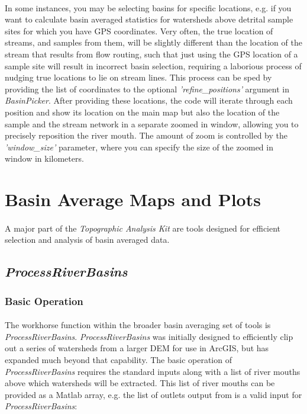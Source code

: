 \paragraph{}In some instances, you may be selecting basins for specific locations, e.g. if you want to calculate basin averaged statistics for watersheds above detrital sample sites for which you have GPS coordinates. Very often, the true location of streams, and samples from them, will be slightly different than the location of the stream that results from flow routing, such that just using the GPS location of a sample site will result in incorrect basin selection, requiring a laborious process of nudging true locations to lie on stream lines. This process can be sped by providing the list of coordinates to the optional \textit{'refine\_positions'} argument in \textit{BasinPicker}. After providing these locations, the code will iterate through each position and show its location on the main map but also the location of the sample and the stream network in a separate zoomed in window, allowing you to precisely reposition the river mouth. The amount of zoom is controlled by the \textit{'window\_size'} parameter, where you can specify the size of the zoomed in window in kilometers.

\section{Basin Average Maps and Plots}

\paragraph{}A major part of the \textit{Topographic Analysis Kit} are tools designed for efficient selection and analysis of basin averaged data.

\subsection{\textit{ProcessRiverBasins}} \label{sec:PrcRvBsn}

\subsubsection{Basic Operation}
\paragraph{}The workhorse function within the broader basin averaging set of tools is \textit{ProcessRiverBasins}. \textit{ProcessRiverBasins} was initially designed to efficiently clip out a series of watersheds from a larger DEM for use in ArcGIS, but has expanded much beyond that capability. The basic operation of \textit{ProcessRiverBasins} requires the standard inputs along with a list of river mouths above which watersheds will be extracted. This list of river mouths can be provided as a Matlab array, e.g. the list of outlets output from  is a valid input for \textit{ProcessRiverBasins}:

